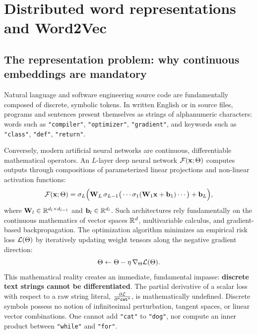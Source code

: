 \documentclass[../../main.tex]{subfiles}
\begin{document}
\chapter{Distributed word representations and Word2Vec}
\label{ch:word_embeddings}

\section{The representation problem: why continuous embeddings are mandatory}
\label{sec:representation_problem}

Natural language and software engineering source code are fundamentally composed of discrete, symbolic tokens. In written English or in source files, programs and sentences present themselves as strings of alphanumeric characters: words such as \texttt{"compiler"}, \texttt{"optimizer"}, \texttt{"gradient"}, and keywords such as \texttt{"class"}, \texttt{"def"}, \texttt{"return"}.

Conversely, modern artificial neural networks are continuous, differentiable mathematical operators. An $L$-layer deep neural network $\mathcal{F}(\mathbf{x}; \Theta)$ computes outputs through compositions of parameterized linear projections and non-linear activation functions:
\begin{equation}
\label{eq:neural_operator}
\mathcal{F}(\mathbf{x}; \Theta) = \sigma_L \Big( \mathbf{W}_L \, \sigma_{L-1}\big( \cdots \sigma_1(\mathbf{W}_1 \mathbf{x} + \mathbf{b}_1) \cdots \big) + \mathbf{b}_L \Big),
\end{equation}
where $\mathbf{W}_l \in \mathbb{R}^{d_l \times d_{l-1}}$ and $\mathbf{b}_l \in \mathbb{R}^{d_l}$. Such architectures rely fundamentally on the continuous mathematics of vector spaces $\mathbb{R}^d$, multivariable calculus, and gradient-based backpropagation. The optimization algorithm minimizes an empirical risk loss $\mathcal{L}(\Theta)$ by iteratively updating weight tensors along the negative gradient direction:
\begin{equation}
\label{eq:gradient_update_rule}
\Theta \leftarrow \Theta - \eta \, \nabla_\Theta \mathcal{L}(\Theta).
\end{equation}
This mathematical reality creates an immediate, fundamental impasse: \textbf{discrete text strings cannot be differentiated}. The partial derivative of a scalar loss with respect to a raw string literal, $\frac{\partial \mathcal{L}}{\partial \text{\texttt{"cat"}}}$, is mathematically undefined. Discrete symbols possess no notion of infinitesimal perturbation, tangent spaces, or linear vector combinations. One cannot add \texttt{"cat"} to \texttt{"dog"}, nor compute an inner product between \texttt{"while"} and \texttt{"for"}.
\end{document}
